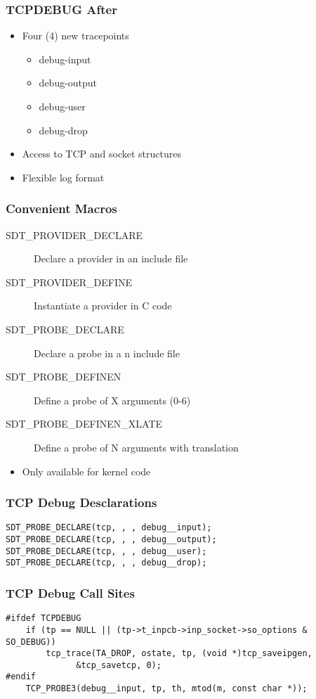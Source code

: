 \documentclass[pdftex]{beamer}
\begin{document}
\begin{frame}
  \frametitle{TCPDEBUG After}
  \begin{itemize}
  \item Four (4) new tracepoints
    \begin{itemize}
    \item debug-input
    \item debug-output
    \item debug-user
    \item debug-drop
    \end{itemize}
  \item Access to TCP and socket structures
  \item Flexible log format
  \end{itemize}
\end{frame}

\begin{frame}
  \frametitle{Convenient Macros}
  \begin{description}
  \item [SDT_PROVIDER_DECLARE] Declare a provider in an include file
  \item [SDT_PROVIDER_DEFINE] Instantiate a provider in C code
  \item [SDT_PROBE_DECLARE] Declare a probe in a n include file
  \item [SDT_PROBE_DEFINEN] Define a probe of X arguments (0-6)
  \item [SDT_PROBE_DEFINEN_XLATE] Define a probe of N arguments with translation
  \end{description}
  \begin{itemize}
  \item Only available for kernel code
  \end{itemize}
\end{frame}

\begin{frame}[fragile]
  \frametitle{TCP Debug Desclarations}
\begin{lstlisting}
SDT_PROBE_DECLARE(tcp, , , debug__input);
SDT_PROBE_DECLARE(tcp, , , debug__output);
SDT_PROBE_DECLARE(tcp, , , debug__user);
SDT_PROBE_DECLARE(tcp, , , debug__drop);
\end{lstlisting}
\end{frame}

\begin{frame}[fragile]
  \frametitle{TCP Debug Call Sites}
\begin{lstlisting}
#ifdef TCPDEBUG
	if (tp == NULL || (tp->t_inpcb->inp_socket->so_options & SO_DEBUG))
		tcp_trace(TA_DROP, ostate, tp, (void *)tcp_saveipgen,
			  &tcp_savetcp, 0);
#endif
	TCP_PROBE3(debug__input, tp, th, mtod(m, const char *));
\end{lstlisting}
\end{frame}
\end{document}
